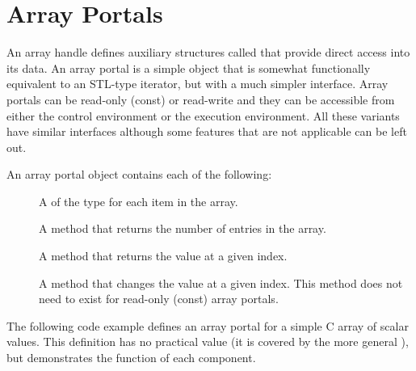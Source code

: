

\section{Array Portals}
\label{sec:ArrayPortals}


An array handle defines auxiliary structures called 
that provide direct access into its data. An array portal is a simple
object that is somewhat functionally equivalent to an STL-type iterator, but
with a much simpler interface. Array portals can be read-only (const) or
read-write and they can be accessible from either the control environment
or the execution environment. All these variants have similar interfaces
although some features that are not applicable can be left out.

An array portal object contains each of the following:
\begin{description}
\item[] A  of the type for each item
  in the array.
\item[] A method that returns the number of
  entries in the array.
\item[] A method that returns the value at a given index.
\item[] A method that changes the value at a given
  index. This method does not need to exist for read-only (const) array
  portals.
\end{description}

The following code example defines an array portal for a simple C array of
scalar values. This definition has no practical value (it is covered by the
more general ), but demonstrates
the function of each component.


